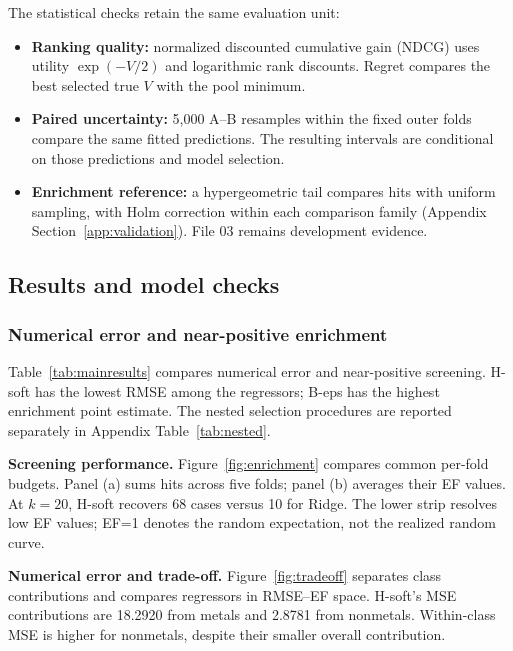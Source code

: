 The statistical checks retain the same evaluation unit:
\begin{itemize}
  \item \textbf{Ranking quality:} normalized discounted cumulative gain (NDCG) uses utility $\exp(-V/2)$ and logarithmic rank discounts. Regret compares the best selected true $V$ with the pool minimum.
  \item \textbf{Paired uncertainty:} 5,000 A--B resamples within the fixed outer folds compare the same fitted predictions. The resulting intervals are conditional on those predictions and model selection.
  \item \textbf{Enrichment reference:} a hypergeometric tail compares hits with uniform sampling, with Holm correction within each comparison family (Appendix Section~\ref{app:validation}). File 03 remains development evidence.
\end{itemize}
\FloatBarrier

\subsection{Results and model checks}
\subsubsection{Numerical error and near-positive enrichment}
Table~\ref{tab:mainresults} compares numerical error and near-positive screening. H-soft has the lowest RMSE among the regressors; B-eps has the highest enrichment point estimate. The nested selection procedures are reported separately in Appendix Table~\ref{tab:nested}.

\FloatBarrier

\textbf{Screening performance.} Figure~\ref{fig:enrichment} compares common per-fold budgets. Panel (a) sums hits across five folds; panel (b) averages their EF values. At $k=20$, H-soft recovers 68 cases versus 10 for Ridge. The lower strip resolves low EF values; EF=1 denotes the random expectation, not the realized random curve.
\FloatBarrier

\textbf{Numerical error and trade-off.} Figure~\ref{fig:tradeoff} separates class contributions and compares regressors in RMSE--EF space. H-soft's MSE contributions are 18.2920 from metals and 2.8781 from nonmetals. Within-class MSE is higher for nonmetals, despite their smaller overall contribution.
\FloatBarrier

